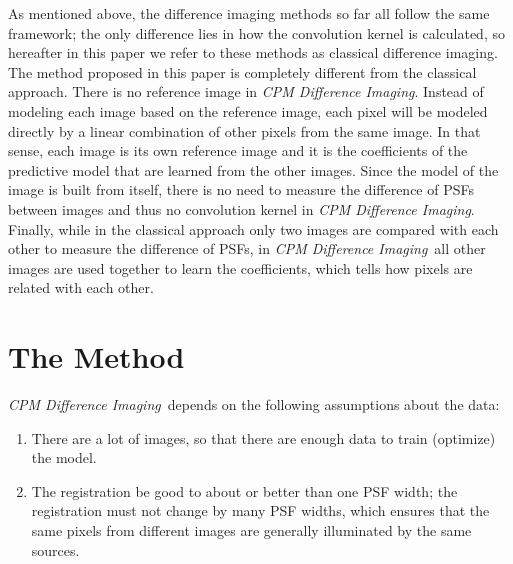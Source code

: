 \documentclass[12pt, preprint]{aastex}
\newcommand{\project}[1]{\textsl{#1}}
\newcommand{\cpmdiff}{\project{CPM Difference Imaging}}
\begin{document}
As mentioned above, the difference imaging methods so far \citep{imagesub1, alard, varyingkernel, bramich} all follow the same framework; the only difference lies in how the convolution kernel is calculated, so hereafter in this paper we refer to these methods as classical difference imaging. 
The method proposed in this paper is completely different from the classical approach. 
There is no reference image in \cpmdiff. 
Instead of modeling each image based on the reference image, each pixel will be modeled directly by a linear combination of other pixels from the same image. 
In that sense, each image is its own reference image and it is the coefficients of the predictive model that are learned from the other images.
Since the model of the image is built from itself, there is no need to measure the difference of PSFs between images and thus no convolution kernel in \cpmdiff. 
Finally, while in the classical approach only two images are compared with each other to measure the difference of PSFs, in \cpmdiff\ all other images are used together to learn the coefficients, which tells how pixels are related with each other.

\section{The Method}
\cpmdiff\ depends on the following assumptions about the data:
\begin{enumerate}
\item
There are a lot of images, so that there are enough data to train (optimize) the model.
\item
The registration be good to about or better than one PSF width; the registration must not change by many PSF widths, which ensures that the same pixels from different images are generally illuminated by the same sources.
\end{enumerate}
\end{document}
